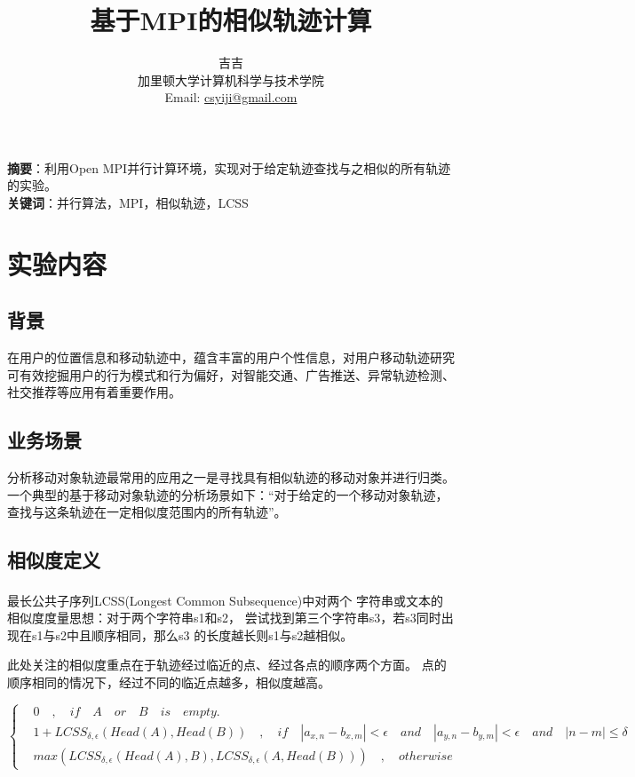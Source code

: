 \documentclass[UTF8]{ctexart}
\title{\huge{\heiti 基于MPI的相似轨迹计算}}
\author{\small{\kaishu 吉吉}\\[2pt]
\small{\kaishu 加里顿大学计算机科学与技术学院}\\[2pt]
\small{Email:}
\url{csyiji@gmail.com}
}
\date{} %
\newcommand{\supercite}[1]{\textsuperscript{\cite{#1}}}
\begin{document}
\maketitle

\begin{flushleft}
\textbf{摘要}：利用Open MPI\supercite{openmpi}并行计算环境，实现对于给定轨迹查找与之相似的所有轨迹的实验。\\[8pt]
\textbf{关键词}：并行算法，MPI，相似轨迹，LCSS
\end{flushleft}
\section{实验内容}\label{sec1}

\subsection{背景}
在用户的位置信息和移动轨迹中，蕴含丰富的用户个性信息，对用户移动轨迹研究可有效挖掘用户的行为模式和行为偏好，对智能交通、广告推送、异常轨迹检测、社交推荐等应用有着重要作用。

\subsection{业务场景}
分析移动对象轨迹最常用的应用之一是寻找具有相似轨迹的移动对象并进行归类。一个典型的基于移动对象轨迹的分析场景如下：“对于给定的一个移动对象轨迹，查找与这条轨迹在一定相似度范围内的所有轨迹”。

\subsection{相似度定义}
\label{sec1:subsec3}
最长公共子序列LCSS(Longest Common Subsequence)\supercite{lcss}中对两个 字符串或文本的相似度度量思想：对于两个字符串s1和s2， 尝试找到第三个字符串s3，若s3同时出现在s1与s2中且顺序相同，那么s3 的长度越长则s1与s2越相似。

此处关注的相似度重点在于轨迹经过临近的点、经过各点的顺序两个方面。
点的顺序相同的情况下，经过不同的临近点越多，相似度越高。

\begin{equation}
\label{sec1:subsec3:eq1}
\left\{
\begin{aligned}
& 0 \quad , \quad if \quad A \quad or \quad B \quad is \quad empty. \\
& 1+LCSS_{\delta,\epsilon}(Head(A),Head(B))\quad , \quad if \quad |a_{x,n}-b_{x,m}|<\epsilon \quad and \quad |a_{y,n}-b_{y,m}|<\epsilon \quad and \quad |n-m|\leq \delta \\
& max(LCSS_{\delta,\epsilon}(Head(A),B),LCSS_{\delta,\epsilon}(A,Head(B))) \quad , \quad otherwise
\end{aligned}
\right.
\end{equation}
\end{document}

